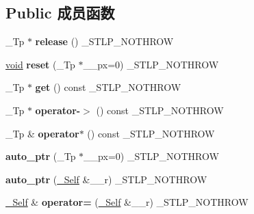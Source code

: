 \subsection*{Public 成员函数}
\begin{DoxyCompactItemize}
\item 
\mbox{\label{classauto__ptr_aba7c26ecf63dfaea20c6bf81bbf20771}} 
\+\_\+\+Tp $\ast$ {\bfseries release} () \+\_\+\+S\+T\+L\+P\+\_\+\+N\+O\+T\+H\+R\+OW
\item 
\mbox{\label{classauto__ptr_a55dcbdd0e4bf2f510bce678d2387e46a}} 
\hyperlink{interfacevoid}{void} {\bfseries reset} (\+\_\+\+Tp $\ast$\+\_\+\+\_\+px=0) \+\_\+\+S\+T\+L\+P\+\_\+\+N\+O\+T\+H\+R\+OW
\item 
\mbox{\label{classauto__ptr_ab7c69a06a046922573974b29bcbe0537}} 
\+\_\+\+Tp $\ast$ {\bfseries get} () const \+\_\+\+S\+T\+L\+P\+\_\+\+N\+O\+T\+H\+R\+OW
\item 
\mbox{\label{classauto__ptr_af14141079ff9dff2ca238672ccc9b9c1}} 
\+\_\+\+Tp $\ast$ {\bfseries operator-\/$>$} () const \+\_\+\+S\+T\+L\+P\+\_\+\+N\+O\+T\+H\+R\+OW
\item 
\mbox{\label{classauto__ptr_a1a0276d649d3f78059550003e6af5fd6}} 
\+\_\+\+Tp \& {\bfseries operator$\ast$} () const \+\_\+\+S\+T\+L\+P\+\_\+\+N\+O\+T\+H\+R\+OW
\item 
\mbox{\label{classauto__ptr_a370f4ef0521ccfe07769d4441159ffe8}} 
{\bfseries auto\+\_\+ptr} (\+\_\+\+Tp $\ast$\+\_\+\+\_\+px=0) \+\_\+\+S\+T\+L\+P\+\_\+\+N\+O\+T\+H\+R\+OW
\item 
\mbox{\label{classauto__ptr_a46773a65dc4ef36811f6cf285abbfb24}} 
{\bfseries auto\+\_\+ptr} (\hyperlink{classauto__ptr}{\+\_\+\+Self} \&\+\_\+\+\_\+r) \+\_\+\+S\+T\+L\+P\+\_\+\+N\+O\+T\+H\+R\+OW
\item 
\mbox{\label{classauto__ptr_a44d6fcf513731246f202cb3934a86b87}} 
\hyperlink{classauto__ptr}{\+\_\+\+Self} \& {\bfseries operator=} (\hyperlink{classauto__ptr}{\+\_\+\+Self} \&\+\_\+\+\_\+r) \+\_\+\+S\+T\+L\+P\+\_\+\+N\+O\+T\+H\+R\+OW
\item 
\mbox{\label{classauto__ptr_a620092958861ccb4202d344cd7b11434}} 

\end{DoxyCompactItemize}
